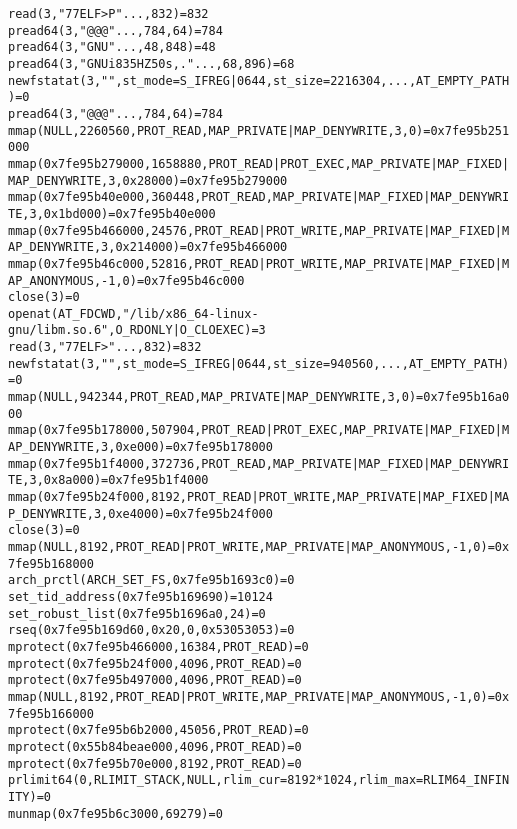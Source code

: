 \documentclass[pdf, unicode, 12pt, a4paper,oneside,fleqn]{article}
\begin{document}
\begin{alltt}
read(3, "\177ELF\2\1\1\3\0\0\0\0\0\0\0\0\3\0>\0\1\0\0\0P\2\0\0\0\0\0"..., 832) = 832
pread64(3, "\6\0\0\0\4\0\0\0@\0\0\0\0\0\0\0@\0\0\0\0\0\0\0@\0\0\0\0\0\0\0"..., 784, 64) = 784
pread64(3, "\4\0\0\0 \0\0\0\5\0\0\0GNU\0\2\0\0\4\0\0\0\3\0\0\0\0\0\0\0"..., 48, 848) = 48
pread64(3, "\4\0\0\0\0\0\0\3\0\0\0GNU\0i8\235HZ\350s,."..., 68, 896) = 68
newfstatat(3, "", {st_mode=S_IFREG|0644, st_size=2216304, ...}, AT_EMPTY_PATH) = 0
pread64(3, "\6\0\0\0\4\0\0\0@\0\0\0\0\0\0\0@\0\0\0\0\0\0\0@\0\0\0\0\0\0\0"..., 784, 64) = 784
mmap(NULL, 2260560, PROT_READ, MAP_PRIVATE|MAP_DENYWRITE, 3, 0) = 0x7fe95b251000
mmap(0x7fe95b279000, 1658880, PROT_READ|PROT_EXEC, MAP_PRIVATE|MAP_FIXED|MAP_DENYWRITE, 3, 0x28000) = 0x7fe95b279000
mmap(0x7fe95b40e000, 360448, PROT_READ, MAP_PRIVATE|MAP_FIXED|MAP_DENYWRITE, 3, 0x1bd000) = 0x7fe95b40e000
mmap(0x7fe95b466000, 24576, PROT_READ|PROT_WRITE, MAP_PRIVATE|MAP_FIXED|MAP_DENYWRITE, 3, 0x214000) = 0x7fe95b466000
mmap(0x7fe95b46c000, 52816, PROT_READ|PROT_WRITE, MAP_PRIVATE|MAP_FIXED|MAP_ANONYMOUS, -1, 0) = 0x7fe95b46c000
close(3)                                = 0
openat(AT_FDCWD, "/lib/x86_64-linux-gnu/libm.so.6", O_RDONLY|O_CLOEXEC) = 3
read(3, "\177ELF\2\1\1\3\0\0\0\0\0\0\0\0\3\0>\0\1\0\0\0\0\0\0\0\0\0\0\0"..., 832) = 832
newfstatat(3, "", {st_mode=S_IFREG|0644, st_size=940560, ...}, AT_EMPTY_PATH) = 0
mmap(NULL, 942344, PROT_READ, MAP_PRIVATE|MAP_DENYWRITE, 3, 0) = 0x7fe95b16a000
mmap(0x7fe95b178000, 507904, PROT_READ|PROT_EXEC, MAP_PRIVATE|MAP_FIXED|MAP_DENYWRITE, 3, 0xe000) = 0x7fe95b178000
mmap(0x7fe95b1f4000, 372736, PROT_READ, MAP_PRIVATE|MAP_FIXED|MAP_DENYWRITE, 3, 0x8a000) = 0x7fe95b1f4000
mmap(0x7fe95b24f000, 8192, PROT_READ|PROT_WRITE, MAP_PRIVATE|MAP_FIXED|MAP_DENYWRITE, 3, 0xe4000) = 0x7fe95b24f000
close(3)                                = 0
mmap(NULL, 8192, PROT_READ|PROT_WRITE, MAP_PRIVATE|MAP_ANONYMOUS, -1, 0) = 0x7fe95b168000
arch_prctl(ARCH_SET_FS, 0x7fe95b1693c0) = 0
set_tid_address(0x7fe95b169690)         = 10124
set_robust_list(0x7fe95b1696a0, 24)     = 0
rseq(0x7fe95b169d60, 0x20, 0, 0x53053053) = 0
mprotect(0x7fe95b466000, 16384, PROT_READ) = 0
mprotect(0x7fe95b24f000, 4096, PROT_READ) = 0
mprotect(0x7fe95b497000, 4096, PROT_READ) = 0
mmap(NULL, 8192, PROT_READ|PROT_WRITE, MAP_PRIVATE|MAP_ANONYMOUS, -1, 0) = 0x7fe95b166000
mprotect(0x7fe95b6b2000, 45056, PROT_READ) = 0
mprotect(0x55b84beae000, 4096, PROT_READ) = 0
mprotect(0x7fe95b70e000, 8192, PROT_READ) = 0
prlimit64(0, RLIMIT_STACK, NULL, {rlim_cur=8192*1024, rlim_max=RLIM64_INFINITY}) = 0
munmap(0x7fe95b6c3000, 69279)           = 0

\end{alltt}
\end{document}
